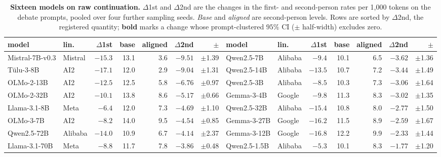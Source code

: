 \begin{table}[tb]
\centering\scriptsize\setlength{\tabcolsep}{2.8pt}
\caption{\textbf{Sixteen models on raw continuation.} $\Delta$1st and $\Delta$2nd are the changes in the first- and second-person rates per 1,000 tokens on the debate prompts, pooled over four further sampling seeds. \emph{Base} and \emph{aligned} are second-person levels. Rows are sorted by $\Delta$2nd, the registered quantity; \textbf{bold} marks a change whose prompt-clustered $95\%$ CI ($\pm$ half-width) excludes zero.}
\label{tab:families}
\begin{tabular}{llrrrrr @{\hspace{1.1em}} llrrrrr}
\toprule
model & lin. & $\Delta$1st & base & aligned & $\Delta$2nd & $\pm$ & model & lin. & $\Delta$1st & base & aligned & $\Delta$2nd & $\pm$ \\
\midrule
Mistral-7B-v0.3 & Mistral & $\mathbf{-15.3}$ & 13.1 & 3.6 & $\mathbf{-9.51}$ & $\pm$1.39 & Qwen2.5-7B & Alibaba & $\mathbf{-9.4}$ & 10.1 & 6.5 & $\mathbf{-3.62}$ & $\pm$1.36 \\
T\"ulu-3-8B & AI2 & $\mathbf{-17.1}$ & 12.0 & 2.9 & $\mathbf{-9.04}$ & $\pm$1.31 & Qwen2.5-14B & Alibaba & $\mathbf{-13.5}$ & 10.7 & 7.2 & $\mathbf{-3.44}$ & $\pm$1.49 \\
OLMo-2-13B & AI2 & $\mathbf{-12.5}$ & 12.5 & 5.8 & $\mathbf{-6.76}$ & $\pm$0.97 & Qwen2.5-3B & Alibaba & $\mathbf{-8.5}$ & 10.3 & 7.3 & $\mathbf{-3.06}$ & $\pm$1.64 \\
OLMo-2-32B & AI2 & $\mathbf{-10.1}$ & 13.8 & 8.6 & $\mathbf{-5.17}$ & $\pm$0.66 & Gemma-3-4B & Google & $\mathbf{-9.8}$ & 11.3 & 8.3 & $\mathbf{-3.02}$ & $\pm$1.35 \\
Llama-3.1-8B & Meta & $\mathbf{-6.4}$ & 12.0 & 7.3 & $\mathbf{-4.69}$ & $\pm$1.10 & Qwen2.5-32B & Alibaba & $\mathbf{-15.4}$ & 10.8 & 8.0 & $\mathbf{-2.77}$ & $\pm$1.50 \\
OLMo-3-7B & AI2 & $\mathbf{-8.2}$ & 14.0 & 9.5 & $\mathbf{-4.54}$ & $\pm$0.85 & Gemma-3-27B & Google & $\mathbf{-16.2}$ & 11.5 & 8.9 & $\mathbf{-2.59}$ & $\pm$1.67 \\
Qwen2.5-72B & Alibaba & $\mathbf{-14.0}$ & 10.9 & 6.7 & $\mathbf{-4.14}$ & $\pm$2.37 & Gemma-3-12B & Google & $\mathbf{-16.8}$ & 12.2 & 9.9 & $\mathbf{-2.33}$ & $\pm$1.44 \\
Llama-3.1-70B & Meta & $\mathbf{-8.8}$ & 11.7 & 7.8 & $\mathbf{-3.86}$ & $\pm$0.48 & Qwen2.5-1.5B & Alibaba & $\mathbf{-5.3}$ & 10.1 & 8.3 & $\mathbf{-1.77}$ & $\pm$1.20 \\
\bottomrule
\end{tabular}
\end{table}
